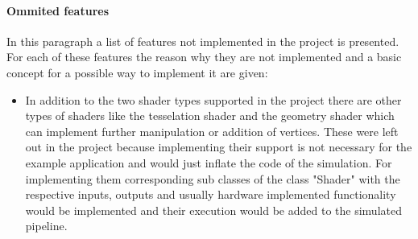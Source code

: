 \paragraph{Ommited features}

In this paragraph a list of features not implemented in the project is presented. For each of these features the reason why they are not implemented and a basic concept for a possible way to implement it are given:

\begin{itemize}
\item In addition to the two shader types supported in the project there are other types of shaders like the tesselation shader and the geometry shader which can implement further manipulation or addition of vertices. These were left out in the project because implementing their support is not necessary for the example application and would just inflate the code of the simulation. For implementing them corresponding sub classes of the class "Shader" with the respective inputs, outputs and usually hardware implemented functionality would be implemented and their execution would be added to the simulated pipeline.

\end{itemize}

